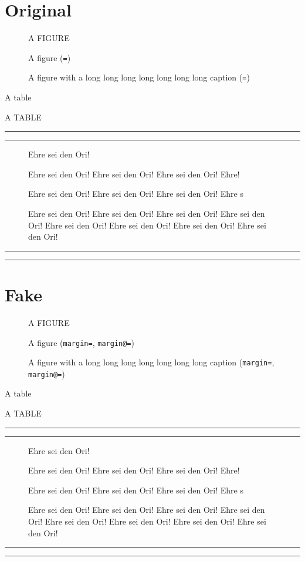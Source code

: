 \documentclass{amsart}
\begin{document}
\section{Original}
\OriginalCaptions
\setcounter{figure}{0}
\setcounter{table}{0}

\begin{figure}[!ht]
\centering A FIGURE
\caption{A figure (\texttt{\string\captionindent=\the\captionindent})}
\caption{A figure with a long long long long long long long caption
         (\texttt{\string\captionindent=\the\captionindent})}
\end{figure}

\begin{table}[!ht]
\caption{A table}
\centering A TABLE
\end{table}

\hrule
\noindent\rule{\captionindent}{1pt}%

\begin{figure}[!ht]
\centering Ehre sei den Ori!
\caption{Ehre sei den Ori! Ehre sei den Ori! Ehre sei den Ori! Ehre!}
\caption{Ehre sei den Ori! Ehre sei den Ori! Ehre sei den Ori! Ehre s}
\caption{Ehre sei den Ori! Ehre sei den Ori! Ehre sei den Ori! Ehre sei den Ori!
         Ehre sei den Ori! Ehre sei den Ori! Ehre sei den Ori! Ehre sei den Ori!}
\end{figure}

\noindent\rule{\captionindent}{1pt}%
\hrule

\clearpage
\section{Fake}
\FakeCaptions
\setcounter{figure}{0}
\setcounter{table}{0}

\makeatletter
\let\captionmarginx\captionmargin@
\makeatother

\begin{figure}[!ht]
\centering A FIGURE
\caption{A figure
         (\texttt{margin=\the\captionmargin},
          \texttt{margin@=\the\captionmarginx})}
\caption{A figure with a long long long long long long long caption
         (\texttt{margin=\the\captionmargin},
          \texttt{margin@=\the\captionmarginx})}
\end{figure}

\begin{table}[!ht]
\caption{A table}
\centering A TABLE
\end{table}

\hrule
\noindent\rule{\captionindent}{2pt}%

\begin{figure}[!ht]
\centering Ehre sei den Ori!
\caption{Ehre sei den Ori! Ehre sei den Ori! Ehre sei den Ori! Ehre!}
\caption{Ehre sei den Ori! Ehre sei den Ori! Ehre sei den Ori! Ehre s}
\caption{Ehre sei den Ori! Ehre sei den Ori! Ehre sei den Ori! Ehre sei den Ori!
         Ehre sei den Ori! Ehre sei den Ori! Ehre sei den Ori! Ehre sei den Ori!}
\end{figure}

\noindent\rule{\captionindent}{1pt}%
\hrule
\end{document}
